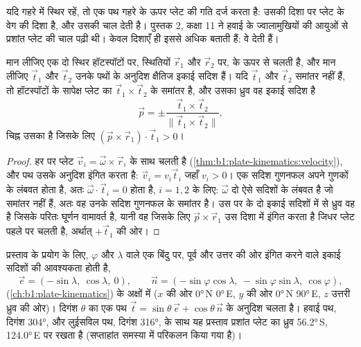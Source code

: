 यदि  गहरे  में स्थिर रहें, तो एक पथ गहरे  के ऊपर प्लेट की गति दर्ज करता है: उसकी दिशा  पर प्लेट के वेग की दिशा है, और उसकी  चाल देती है। पुस्तक 2, कक्षा 11 ने हवाई के ज्वालामुखियों की आयुओं से प्रशांत प्लेट की चाल पढ़ी थी। केवल दिशाएँ ही इससे अधिक बताती हैं: वे  देती हैं।

\begin{proposition}[दो पथों से यूलर ध्रुव]
\label{prop:b1:hotspots:two-tracks}
मान लीजिए एक  दो स्थिर हॉटस्पॉटों पर, स्थितियों $\vec r_1$ और $\vec r_2$ पर, के ऊपर से चलती है, और मान लीजिए $\vec t_1$ और $\vec t_2$ उनके पथों के अनुदिश क्षैतिज इकाई सदिश हैं। यदि $\vec t_1$ और $\vec t_2$ समांतर नहीं हैं, तो हॉटस्पॉटों के सापेक्ष प्लेट का  $\vec t_1\times\vec t_2$ के समांतर है, और उसका ध्रुव वह इकाई सदिश है
\[
  \vec p = \pm\frac{\vec t_1\times\vec t_2}{\lVert\vec t_1\times\vec t_2\rVert},
\]
चिह्न उसका है जिसके लिए $(\vec p\times\vec r_1)\cdot\vec t_1 > 0$।
\end{proposition}

\begin{proof}
हर  पर प्लेट $\vec v_i = \vec\omega\times\vec r_i$ के साथ चलती है (\cref{thm:b1:plate-kinematics:velocity}), और पथ उसके अनुदिश इंगित करता है: $\vec v_i = v_i\vec t_i$ जहाँ $v_i > 0$। एक सदिश गुणनफल अपने गुणकों के लंबवत होता है, अतः $\vec\omega\cdot\vec t_i = 0$ होता है, $i = 1, 2$ के लिए: $\vec\omega$ दो ऐसे सदिशों के लंबवत है जो समांतर नहीं हैं, अतः वह उनके सदिश गुणनफल के समांतर है। उस पर के दो इकाई सदिशों में से ध्रुव वह है जिसके परितः घूर्णन वामावर्त है, यानी वह जिसके लिए $\vec p\times\vec r_1$ उस दिशा में इंगित करता है जिधर प्लेट पहले  पर चलती है, अर्थात् $+\vec t_1$ की ओर।
\end{proof}

प्रस्ताव के प्रयोग के लिए,  $\varphi$ और  $\lambda$ वाले एक बिंदु पर, पूर्व और उत्तर की ओर इंगित करने वाले इकाई सदिशों की आवश्यकता होती है,
\[
  \vec e = (-\sin\lambda,\ \cos\lambda,\ 0),\qquad
  \vec n = (-\sin\varphi\cos\lambda,\ -\sin\varphi\sin\lambda,\ \cos\varphi),
\]
(\cref{ch:b1:plate-kinematics}) के अक्षों में ($x$ की ओर \ang{0}\,N \ang{0}\,E, $y$ की ओर \ang{0}\,N \ang{90}\,E, $z$ उत्तरी ध्रुव की ओर)। दिगंश $\theta$ का एक पथ $\vec t = \sin\theta\,\vec e +
\cos\theta\,\vec n$ के अनुदिश चलता है। हवाई पथ, दिगंश \ang{304}, और लुईसविल पथ, दिगंश \ang{316}, के साथ यह प्रस्ताव प्रशांत प्लेट का ध्रुव \ang{56.2}\,S, \ang{124.0}\,E पर रखता है (सप्ताहांत समस्या में परिकलन किया गया है)।


